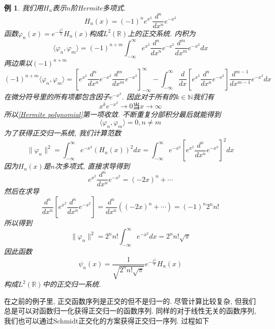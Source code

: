 \documentclass[a4paper,11pt]{article}
\newtheorem{example}{例}[section]
\begin{document}
\begin{example}
  我们用$H_n$表示$n$阶Hermite多项式.
  \begin{equation*}
    H_n(x)=(-1)^ne^{x^2}\frac{d^n}{dx^n}e^{-x^2}
  \end{equation*}
  函数$\varphi_n(x)=e^{-\frac{x^2}{2}}H_n(x)$构成$L^2(\mathbb{R})$上的正交系统. 内积为
  \begin{equation*}
    \langle\varphi_n,\varphi_m\rangle=(-1)^{n+m}\int_{-\infty}^{\infty}e^{x^2}\frac{d^n}{dx^n}e^{-x^2}\frac{d^m}{dx^m}e^{-x^2}dx
  \end{equation*}
  两边乘以$(-1)^{n+m}$
  \begin{equation}\label{Hermite polynomial}
    (-1)^{n+m}\langle\varphi_n,\varphi_m\rangle=\left[ e^{x^2}\frac{d^n}{dx^n}e^{-x^2}\frac{d^m}{dx^m}e^{-x^2}\right]^{\infty}_{-\infty}-\int_{-\infty}^{\infty}\frac{d}{dx}\left[e^{x^2}\frac{d^n}{dx^n}e^{-x^2}\right]\frac{d^{m-1}}{dx^{m-1}}e^{-x^2}dx
  \end{equation}
  在微分符号里的所有项都包含因子$e^{-x^2}$. 因此对于所有的$k\in \mathbb{N}$我们有
  \begin{equation*}
    x^ke^{-x^2}\to 0\text{当}x\to\infty
  \end{equation*}
  所以\eqref{Hermite polynomial}第一项收敛. 不断重复分部积分最后就能得到
  \begin{equation*}
    \langle\varphi_n,\varphi_m\rangle=0, n\neq m
  \end{equation*}
  为了获得正交归一系统, 我们计算范数
  \begin{equation*}
    \|\varphi_n\|^2=\int_{-\infty}^{\infty}e^{-x^2}(H_n(x))^2dx=\int_{-\infty}^{\infty}e^{-x^2}\left[e^{x^2}\frac{d^n}{dx^n}e^{-x^2}\right]^2dx
  \end{equation*}
  因为$H_n(x)$是$n$次多项式, 直接求导得到
  \begin{equation*}
    e^{x^2}\frac{d^n}{dx^n}e^{-x^2}=(-2x)^n+\cdots
  \end{equation*}
  然后在求导
  \begin{equation*}
    \frac{d^n}{dx^n}\left[e^{x^2}\frac{d^n}{dx^n}e^{-x^2}\right]=\frac{d^n}{dx^n}((-2x)^n+\cdots)=(-1)^n2^nn!
  \end{equation*}
  所以得到
  \begin{equation*}
    \|\varphi_n\|^2=2^nn!\int_{-\infty}^{\infty}e^{-x^2}dx=2^nn!\sqrt{\pi}
  \end{equation*}
  因此函数
  \begin{equation*}
    \psi_n(x)=\frac{1}{\sqrt{2^nn!\sqrt{\pi}}}e^{-\frac{x^2}{2}}H_n(x)
  \end{equation*}
  构成$L^2(\mathbb{R})$中的正交归一系统.
\end{example}
在之前的例子里, 正交函数序列是正交的但不是归一的. 尽管计算比较复杂, 但我们总是可以对函数归一化获得正交归一的函数序列. 同样的对于线性无关的函数序列, 我们也可以通过Schmidt正交化的方案获得正交归一序列. 过程如下
\end{document}
